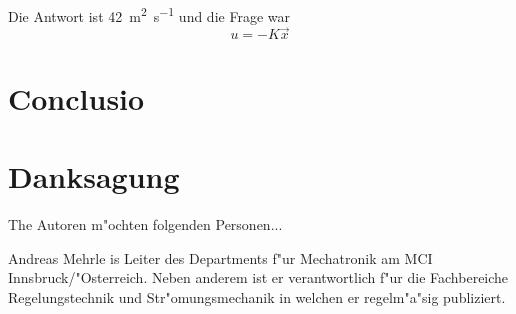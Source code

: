 \documentclass[journal,9pt]{IEEEtran}
\begin{document}
Die Antwort ist \SI[per-mode=fraction]{42}{\meter\squared\per\second} und die Frage war
\begin{equation}
    u=-K\vec{x}
\end{equation}

\section{Conclusio}


\section*{Danksagung}

The Autoren m"ochten folgenden Personen...




%


%

\begin{IEEEbiography}{Andreas Mehrle}
is Leiter des Departments f"ur Mechatronik am MCI Innsbruck/"Osterreich. Neben anderem ist er verantwortlich f"ur die Fachbereiche Regelungstechnik und Str"omungsmechanik in welchen er regelm"a"sig publiziert.
\end{IEEEbiography}

\end{document}
